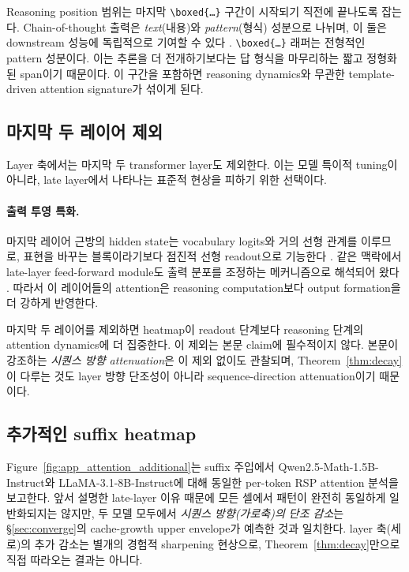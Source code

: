 Reasoning position 범위는 마지막 \texttt{\textbackslash boxed\{\ldots\}} 구간이 시작되기 직전에 끝나도록 잡는다. Chain-of-thought 출력은 \textit{text}(내용)와 \textit{pattern}(형식) 성분으로 나뉘며, 이 둘은 downstream 성능에 독립적으로 기여할 수 있다 \citep{madaan2022text}. \texttt{\textbackslash boxed\{\ldots\}} 래퍼는 전형적인 pattern 성분이다. 이는 추론을 더 전개하기보다는 답 형식을 마무리하는 짧고 정형화된 span이기 때문이다. 이 구간을 포함하면 reasoning dynamics와 무관한 template-driven attention signature가 섞이게 된다.

\subsection{마지막 두 레이어 제외}

Layer 축에서는 마지막 두 transformer layer도 제외한다. 이는 모델 특이적 tuning이 아니라, late layer에서 나타나는 표준적 현상을 피하기 위한 선택이다.

\paragraph{출력 투영 특화.}
마지막 레이어 근방의 hidden state는 vocabulary logits와 거의 선형 관계를 이루므로, 표현을 바꾸는 블록이라기보다 점진적 선형 readout으로 기능한다 \citep{belrose2023eliciting}. 같은 맥락에서 late-layer feed-forward module도 출력 분포를 조정하는 메커니즘으로 해석되어 왔다 \citep{geva2021transformer}. 따라서 이 레이어들의 attention은 reasoning computation보다 output formation을 더 강하게 반영한다.

마지막 두 레이어를 제외하면 heatmap이 readout 단계보다 reasoning 단계의 attention dynamics에 더 집중한다. 이 제외는 본문 claim에 필수적이지 않다. 본문이 강조하는 \emph{시퀀스 방향 attenuation}은 이 제외 없이도 관찰되며, Theorem~\ref{thm:decay}이 다루는 것도 layer 방향 단조성이 아니라 sequence-direction attenuation이기 때문이다.

\subsection{추가적인 suffix heatmap}

Figure~\ref{fig:app_attention_additional}는 suffix 주입에서 Qwen2.5-Math-1.5B-Instruct와 LLaMA-3.1-8B-Instruct에 대해 동일한 per-token RSP attention 분석을 보고한다. 앞서 설명한 late-layer 이유 때문에 모든 셀에서 패턴이 완전히 동일하게 일반화되지는 않지만, 두 모델 모두에서 \emph{시퀀스 방향(가로축)의 단조 감소}는 §\ref{sec:converge}의 cache-growth upper envelope가 예측한 것과 일치한다. layer 축(세로)의 추가 감소는 별개의 경험적 sharpening 현상으로, Theorem~\ref{thm:decay}만으로 직접 따라오는 결과는 아니다.

